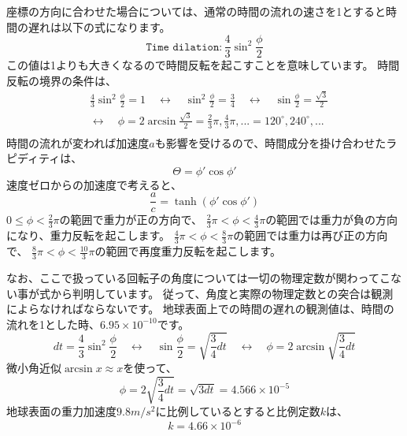 \documentclass[a4paper,12pt,notitlepage]{jsreport}
\begin{document}
座標の方向に合わせた場合については、通常の時間の流れの速さを1とすると時間の遅れは以下の式になります。
\begin{equation}
  \texttt{Time dilation}: \frac{4}{3} \sin^2 \frac{\phi}{2}
\end{equation}
この値は1よりも大きくなるので時間反転を起こすことを意味しています。
時間反転の境界の条件は、
\begin{equation}
  \begin{split}
    & \frac{4}{3} \sin^2 \frac{\phi}{2} = 1
    \quad \leftrightarrow \quad \sin^2 \frac{\phi}{2} = \frac{3}{4}
    \quad \leftrightarrow \quad \sin \frac{\phi}{2} = \frac{\sqrt{3}}{2} \\
    & \leftrightarrow \quad \phi = 2 \arcsin \frac{\sqrt{3}}{2} 
    = \frac{2}{3} \pi, \frac{4}{3} \pi, ... = 120^\circ, 240^\circ, ... \\
  \end{split}
\end{equation}
時間の流れが変われば加速度$ a $も影響を受けるので、時間成分を掛け合わせたラピディティは、
\begin{equation}
  \Theta = \phi' \cos \phi'
\end{equation}
速度ゼロからの加速度で考えると、
\begin{equation}
  \frac{a}{c} = \tanh( \phi' \cos \phi' )
\end{equation}
$ 0 \le \phi < \frac{2}{3} \pi $の範囲で重力が正の方向で、
$ \frac{2}{3} \pi < \phi < \frac{4}{3} \pi $の範囲では重力が負の方向になり、重力反転を起こします。
$ \frac{4}{3} \pi < \phi < \frac{8}{3} \pi $の範囲では重力は再び正の方向で、
$ \frac{8}{3} \pi < \phi < \frac{10}{3} \pi $の範囲で再度重力反転を起こします。

なお、ここで扱っている回転子の角度については一切の物理定数が関わってこない事が式から判明しています。
従って、角度と実際の物理定数との突合は観測によらなければならないです。
地球表面上での時間の遅れの観測値は、時間の流れを1とした時、$ 6.95 \times 10^{-10} $です。
\begin{equation}
  dt = \frac{4}{3} \sin^2 \frac{\phi}{2}
  \quad \leftrightarrow \quad \sin \frac{\phi}{2} = \sqrt{\frac{3}{4} dt}
  \quad \leftrightarrow \quad \phi = 2 \arcsin \sqrt{\frac{3}{4} dt}
\end{equation}
微小角近似$\arcsin x \approx x$を使って、
\begin{equation}
  \phi = 2 \sqrt{\frac{3}{4} dt} = \sqrt{3 dt} = 4.566 \times 10^{-5}
\end{equation}
地球表面の重力加速度$ 9.8 m/s^2 $に比例しているとすると比例定数$ k $は、
\begin{equation}
  k = 4.66 \times 10^{-6}
\end{equation}
\end{document}
